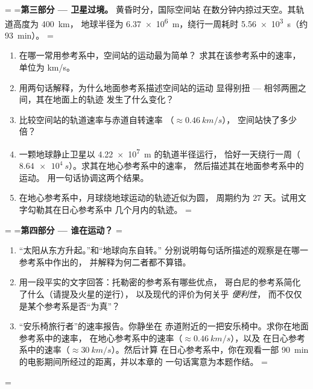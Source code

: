 \begin{problem}
=\medskip
=\noindent\textbf{第三部分 --- 卫星过境。}
黄昏时分，国际空间站
在数分钟内掠过天空。其轨道高度为 \qty{400}{km}，
地球半径为 \qty{6.37e6}{m}，绕行一周耗时 \qty{5.56e3}{s}（约
\qty{93}{min}）。
=\begin{enumerate}[resume]
  \item 在哪一常用参考系中，空间站的运动最为简单？
        求其在该参考系中的速率，单位为 \unit{km/s}。
  \item 用两句话解释，为什么地面参考系描述空间站的运动
        显得别扭 --- 相邻两圈之间，其在地面上的轨迹
        发生了什么变化？
  \item 比较空间站的轨道速率与赤道自转速率
        （$\approx \qty{0.46}{km/s}$），
        空间站快了多少倍？
  \item 一颗地球静止卫星以 \qty{4.22e7}{m} 的轨道半径运行，
        恰好一天绕行一周（$\qty{8.64e4}{s}$）。求其在地心参考系中的速率，
        然后描述其在地面参考系中的运动。
        用一句话协调这两个结果。
  \item 在地心参考系中，月球绕地球运动的轨迹近似为圆，
        周期约为 $27$ 天。试用文字勾勒其在日心参考系中
        几个月内的轨迹。
=\end{enumerate}

=\medskip
=\noindent\textbf{第四部分 --- 谁在运动？}
=\begin{enumerate}[resume]
  \item “太阳从东方升起。”和“地球向东自转。”
        分别说明每句话所描述的观察是在哪一参考系中作出的，
        并解释为何二者都不算错。
  \item 用一段平实的文字回答：托勒密的参考系有哪些优点，
        哥白尼的参考系简化了什么（请提及火星的逆行），
        以及现代的评价为何关乎 \emph{便利性}，
        而不仅仅是某个参考系是否“为真”？
  \item “安乐椅旅行者”的速率报告。你静坐在
        赤道附近的一把安乐椅中。求你在地面参考系中的速率，
        在地心参考系中的速率（$\approx \qty{0.46}{km/s}$），以及
        在日心参考系中的速率（$\approx \qty{30}{km/s}$）。然后计算
        在日心参考系中，你在观看一部
        \qty{90}{min} 的电影期间所经过的距离，并以本章的
        一句话寓意为本题作结。
=\end{enumerate}
=\end{problem}
